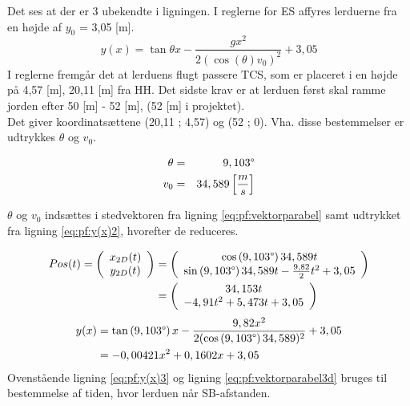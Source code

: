 Det ses at der er 3 ubekendte i ligningen. I reglerne for ES affyres lerduerne fra en højde af \(y_0\) = 3,05 [m].
\begin{equation}
y(x) = \tan \theta x - \frac{gx^2}{2(\cos \left( \theta \right)  v_0)^2} + 3,05
\label{eq:pf:y(x)2}
\end{equation}
I reglerne fremgår det at lerduens flugt passere TCS, som er placeret i en højde på 4,57 [m], 20,11 [m] fra HH. Det sidste krav er at lerduen først skal ramme jorden efter 50 [m] - 52 [m], (52 [m] i projektet). \\
Det giver koordinatsættene (20,11 ; 4,57) og (52 ; 0). Vha. disse bestemmelser er udtrykkes \(\theta\) og \(v_0\).

\begin{eqnarray}
\theta &=& 9,103 \degree \\
v_0 &=& 34,589 \left[ \frac { m }{ s }  \right] 
\end{eqnarray}

 \(\theta\) og \(v_0\) indsættes i stedvektoren fra ligning \ref{eq:pf:vektorparabel} samt udtrykket fra ligning \ref{eq:pf:y(x)2}, hvorefter de reduceres.

\begin{align}
\begin{split}
	Pos(t) = \left( \begin{array}{c}
	x_{2D}(t) \\
	y_{2D}(t)
	\end{array}
	\right)
	&= \left( \begin{array}{c}
	\cos \left(9,103 \degree \right) 34,589 t \\
	\sin \left(9,103 \degree \right) 34,589 t - \frac{9,82}{2} t^2 + 3,05
	\end{array}
	\right) \\
	&= \left( \begin{array}{c}
	34,153 t \\
	- 4,91 t^2 + 5,473 t + 3,05
	\end{array}
	\right)
\label{eq:pf:vektorparabel2}
\end{split}
\end{align}
\begin{align}
\begin{split}
y(x) &= \tan \left(9,103 \degree \right) x - \frac{9,82x^2}{2(\cos \left(9,103 \degree \right) 34,589)^2} + 3,05 \\
&= - 0,00421 x^2 + 0,1602 x  + 3,05
\label{eq:pf:y(x)3}
\end{split}
\end{align}
Ovenstående ligning \ref{eq:pf:y(x)3} og ligning \ref{eq:pf:vektorparabel3d} bruges til bestemmelse af tiden, hvor lerduen når SB-afstanden.

